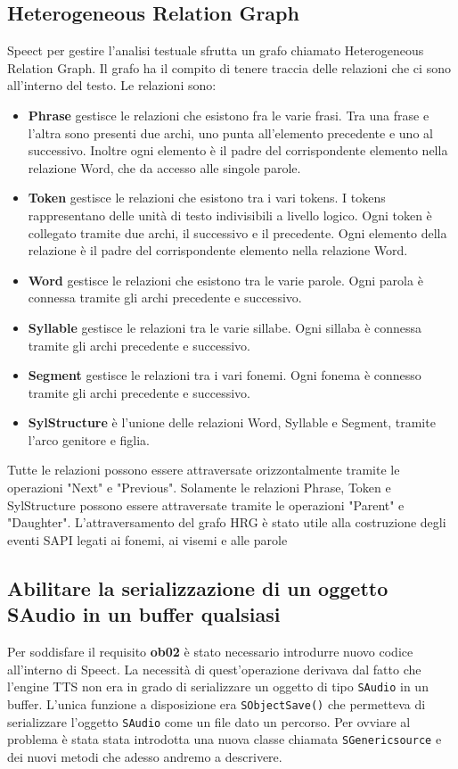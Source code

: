 \subsection{Heterogeneous Relation Graph}
Speect per gestire l'analisi testuale sfrutta un grafo chiamato Heterogeneous Relation Graph.
Il grafo ha il compito di tenere traccia delle relazioni che ci sono all'interno del testo.
Le relazioni sono:
\begin{itemize}
	\item \textbf{Phrase} gestisce le relazioni che esistono fra le varie frasi. Tra una frase e l'altra sono presenti due archi, uno punta all'elemento precedente e uno al successivo. Inoltre ogni elemento è il padre del corrispondente elemento nella relazione Word, che da accesso alle singole parole.   
	\item \textbf{Token} gestisce le relazioni che esistono tra i vari tokens. I tokens rappresentano delle unità di testo indivisibili a livello logico.
	Ogni token è collegato tramite due archi, il successivo e il precedente.
	Ogni elemento della relazione è il padre del corrispondente elemento nella relazione Word.
	\item \textbf{Word} gestisce le relazioni che esistono tra le varie parole. Ogni parola è connessa tramite gli archi precedente e successivo.
	\item \textbf{Syllable} gestisce le relazioni tra le varie sillabe. Ogni sillaba è connessa tramite gli archi precedente e successivo.
	\item \textbf{Segment} gestisce le relazioni tra i vari fonemi. Ogni fonema è connesso tramite gli archi precedente e successivo.
	\item \textbf{SylStructure} è l'unione delle relazioni Word, Syllable e Segment, tramite l'arco genitore e figlia.
\end{itemize}
Tutte le relazioni possono essere attraversate orizzontalmente tramite le operazioni "Next" e "Previous".
Solamente le relazioni Phrase, Token e SylStructure possono essere attraversate tramite le operazioni "Parent" e "Daughter".
L'attraversamento del grafo HRG è stato utile alla costruzione degli eventi SAPI legati ai fonemi, ai visemi e alle parole
\subsection{Abilitare la serializzazione di un oggetto SAudio in un buffer qualsiasi}
Per soddisfare il requisito \textbf{ob02} è stato necessario introdurre nuovo codice all'interno di Speect.
La necessità di quest'operazione derivava dal fatto che l'engine TTS non era in grado di serializzare un oggetto di tipo \texttt{SAudio} in un buffer.
L'unica funzione a disposizione era \texttt{SObjectSave()} che permetteva di serializzare l'oggetto \texttt{SAudio} come un file dato un percorso.
Per ovviare al problema è stata stata introdotta una nuova classe chiamata \texttt{SGenericsource} e dei nuovi metodi che adesso andremo a descrivere.
